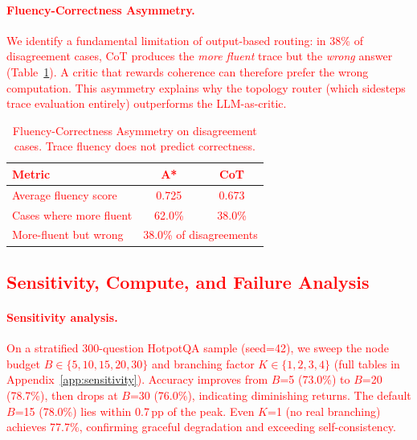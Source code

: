 \documentclass[11pt]{article}
\begin{document}
\textcolor{red}{\paragraph{Fluency-Correctness Asymmetry.}
We identify a fundamental limitation of output-based routing: in 38\% of disagreement cases, CoT produces the \emph{more fluent} trace but the \emph{wrong} answer (Table~\ref{tab:fluency_asymmetry}). A critic that rewards coherence can therefore prefer the wrong computation. This asymmetry explains why the topology router (which sidesteps trace evaluation entirely) outperforms the LLM-as-critic.}

\begin{table}[t]
\centering
\small
\textcolor{red}{
\begin{tabular}{lcc}
\toprule
\textbf{Metric} & \textbf{A*} & \textbf{CoT} \\
\midrule
Average fluency score & 0.725 & 0.673 \\
Cases where more fluent & 62.0\% & 38.0\% \\
More-fluent but wrong & \multicolumn{2}{c}{38.0\% of disagreements} \\
\bottomrule
\end{tabular}}
\caption{\textcolor{red}{Fluency-Correctness Asymmetry on disagreement cases. Trace fluency does not predict correctness.}}
\label{tab:fluency_asymmetry}
\end{table}

\textcolor{red}{\subsection{Sensitivity, Compute, and Failure Analysis}
\label{sec:sensitivity}}

\textcolor{red}{\paragraph{Sensitivity analysis.}
On a stratified 300-question HotpotQA sample (seed=42), we sweep the node budget $B \in \{5,10,15,20,30\}$ and branching factor $K \in \{1,2,3,4\}$ (full tables in Appendix~\ref{app:sensitivity}). Accuracy improves from $B$=5 (73.0\%) to $B$=20 (78.7\%), then drops at $B$=30 (76.0\%), indicating diminishing returns. The default $B$=15 (78.0\%) lies within 0.7\,pp of the peak. Even $K$=1 (no real branching) achieves 77.7\%, confirming graceful degradation and exceeding self-consistency.}
\end{document}
